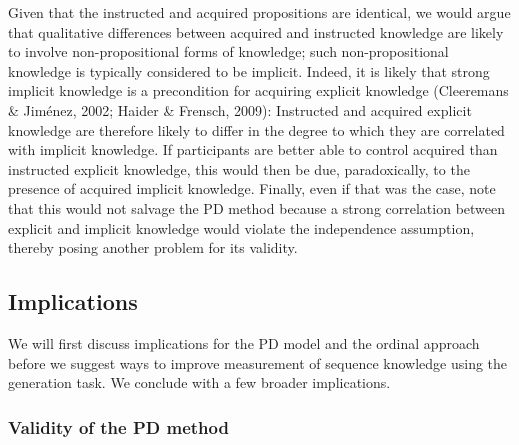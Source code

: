 \documentclass[floatsintext,man]{apa6}
\begin{document}
Given that the instructed and acquired propositions are identical, we
would argue that qualitative differences between acquired and instructed
knowledge are likely to involve non-propositional forms of knowledge;
such non-propositional knowledge is typically considered to be implicit.
Indeed, it is likely that strong implicit knowledge is a precondition
for acquiring explicit knowledge (Cleeremans \& Jiménez, 2002; Haider \&
Frensch, 2009): Instructed and acquired explicit knowledge are therefore
likely to differ in the degree to which they are correlated with
implicit knowledge. If participants are better able to control acquired
than instructed explicit knowledge, this would then be due,
paradoxically, to the presence of acquired implicit knowledge. Finally,
even if that was the case, note that this would not salvage the PD
method because a strong correlation between explicit and implicit
knowledge would violate the independence assumption, thereby posing
another problem for its validity.

\subsection{Implications}\label{implications}

We will first discuss implications for the PD model and the ordinal
approach before we suggest ways to improve measurement of sequence
knowledge using the generation task. We conclude with a few broader
implications.

\subsubsection{Validity of the PD
method}\label{validity-of-the-pd-method}
\end{document}

